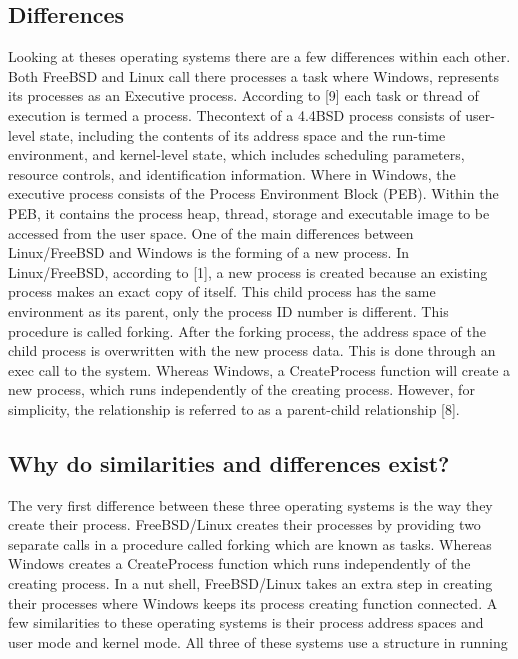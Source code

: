 \documentclass[letterpaper,10pt,titlepage]{article}
\begin{document}
\subsection{Differences}

Looking at theses operating systems there are a few differences within each other. Both FreeBSD and Linux call there processes a task where Windows, represents its processes as an Executive process. According to [9]  each task or thread of execution is termed a process. Thecontext of a 4.4BSD process consists of user-level state, including the contents of its address space and the run-time environment, and kernel-level state, which includes scheduling parameters, resource controls, and identification information. Where in Windows, the executive process consists of the Process Environment Block (PEB). Within the PEB, it contains the process heap, thread, storage and executable image to be accessed from the user space. One of the main differences between Linux/FreeBSD and Windows is the forming of a new process. In Linux/FreeBSD, according to [1], a new process is created because an existing process makes an exact copy of itself. This child process has the same environment as its parent, only the process ID number is different. This procedure is called forking. After the forking process, the address space of the child process is overwritten with the new process data. This is done through an exec call to the system. Whereas Windows, a CreateProcess function will create a new process, which runs independently of the creating process. However, for simplicity, the relationship is referred to as a parent-child relationship [8].

\subsection{Why do similarities and differences exist?}

The very first difference between these three operating systems is the way they create their process. FreeBSD/Linux creates their processes by providing two separate calls in a procedure called forking which are known as tasks. Whereas Windows creates a CreateProcess function which runs independently of the creating process. In a nut shell, FreeBSD/Linux takes an extra step in creating their processes where Windows keeps its process creating function connected. A few similarities to these operating systems is their process address spaces and user mode and kernel mode. All three of these systems use a structure in running    \\
\end{document}
